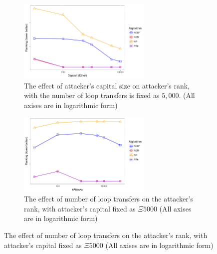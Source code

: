 \begin{figure}[htbp]
	\centering
	\begin{subfigure}{\linewidth}
		\centering
		\includegraphics[width=0.7\textwidth]{figs/AttackDeposit.pdf}
		\caption{The effect of attacker's capital size on attacker's rank, with the number of loop transfers is fixed as $5,000$. \small{(All axises are in logarithmic form)}}
		\label{subfig:deposit}
	\end{subfigure}

	\begin{subfigure}{\linewidth}
	    \centering
		\includegraphics[width=0.7\textwidth]{figs/AttackTimes.pdf}
		\caption{The effect of number of loop transfers on the attacker's rank, with attacker's capital fixed as $\Xi5000$ \small{(All axises are in logarithmic form)}}\label{subfig:times}
	\end{subfigure}


\end{figure}
